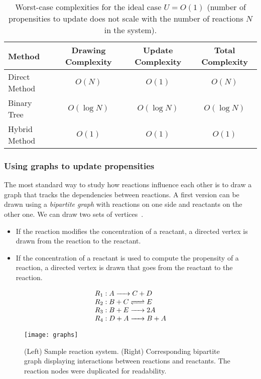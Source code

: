 \begin{table}[!h]
  \centering
  \begin{tabular}{|l|c|c|c|}
    \hline
    Method & Drawing Complexity & Update Complexity & Total Complexity\\
    \hline
    Direct Method & $O(N)$ & $O(1)$ & $O(N)$\\
    Binary Tree & $O(\log N)$ & $O(\log N)$ & $O(\log N)$\\
    Hybrid Method & $O(1)$ & $O(1)$ & $O(1)$\\
    \hline
  \end{tabular}
  \caption{Worst-case complexities for the ideal case $U=O(1)$ (number of propensities to update does not scale with the number of reactions $N$ in the system).}
\label{tab:ideal_update}
\end{table}

\subsubsection{Using graphs to update propensities}

The most standard way to study how reactions influence each other is to draw a graph that tracks the dependencies between reactions.
A first version can be drawn using a \emph{bipartite graph} with reactions on one side and reactants on the other one.
We can draw two sets of vertices~.
\begin{itemize}
  \item If the reaction modifies the concentration of a reactant,
  a directed vertex is drawn from the reaction to the reactant.
  \item If the concentration of a reactant is used to compute the propensity of a reaction,
  a directed vertex is drawn that goes from the reactant to the reaction.
\end{itemize}

\begin{figure}[!h]
  \centering
  \begin{minipage}{0.39\textwidth}
    \[
    \begin{array}{l}
      R_1:\reactionIrr{A}{C+D}{}{} \\
      R_2:\reactionRev{B+C}{E}{}{} \\
      R_3:\reactionIrr{B+E}{2A}{}{} \\
      R_4:\reactionIrr{D+A}{B+A}{}{}
    \end{array}
    \]
  \end{minipage}
  \begin{minipage}{0.59\textwidth}
    \texttt{[image: graphs]}
  \end{minipage}
  \caption{(Left) Sample reaction system.
  (Right) Corresponding bipartite graph displaying interactions between reactions and reactants.
  The reaction nodes were duplicated for readability.}
\label{fig:reactant_reaction_graph}
\end{figure}

